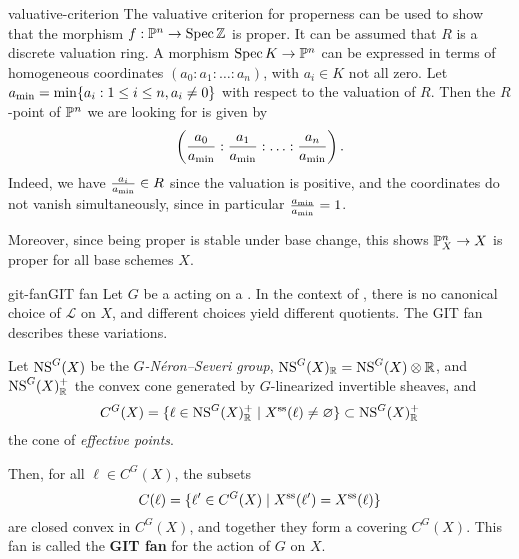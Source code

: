 \begin{example}{valuative-criterion}
    The valuative criterion for properness can be used to show that the morphism $f : \mathbb{P}^n \to \operatorname{Spec} \mathbb{Z}$ is proper. It can be assumed that $R$ is a discrete valuation ring. A morphism $\operatorname{Spec} K \to \mathbb{P}^n$ can be expressed in terms of homogeneous coordinates $(a_0 : a_1 : \ldots : a_n)$, with $a_i \in K$ not all zero. Let $a_\textup{min} = \min \{ a_i : 1 \le i \le n, a_i \ne 0 \}$ with respect to the valuation of $R$. Then the $R$-point of $\mathbb{P}^n$ we are looking for is given by
    \[ \left( \frac{a_0}{a_\textup{min}} : \frac{a_1}{a_\textup{min}} : \ldots : \frac{a_n}{a_\textup{min}} \right) . \]
    Indeed, we have $\frac{a_i}{a_\textup{min}} \in R$ since the valuation is positive, and the coordinates do not vanish simultaneously, since in particular $\frac{a_\textup{min}}{a_\textup{min}} = 1$.
    
    Moreover, since being proper is stable under base change, this shows $\mathbb{P}^n_X \to X$ is proper for all base schemes $X$.
\end{example}

\begin{topic}{git-fan}{GIT fan}
    Let $G$ be a  acting on a  . In the context of , there is no canonical choice of   $\mathcal{L}$ on $X$, and different choices yield different quotients. The GIT fan describes these variations.
    
    Let $\textup{NS}^G(X)$ be the \textit{$G$-Néron--Severi group}, $\textup{NS}^G(X)_{\mathbb{R}} = \textup{NS}^G(X) \otimes \mathbb{R}$, and $\textup{NS}^G(X)_{\mathbb{R}}^+$ the convex cone generated by  $G$-linearized invertible sheaves, and
    \[ C^G(X) = \{ \ell \in \textup{NS}^G(X)_{\mathbb{R}}^+ \mid X^\textup{ss}(\ell) \ne \varnothing \} \subset \textup{NS}^G(X)_{\mathbb{R}}^+ \]
    the cone of \textit{effective points}.
    
    Then, for all $\ell \in C^G(X)$, the subsets
    \[ C(\ell) = \{ \ell' \in C^G(X) \mid X^\textup{ss}(\ell') = X^\textup{ss}(\ell) \} \]
    are closed convex  in $C^G(X)$, and together they form a  covering $C^G(X)$. This fan is called the \textbf{GIT fan} for the action of $G$ on $X$.
\end{topic}

